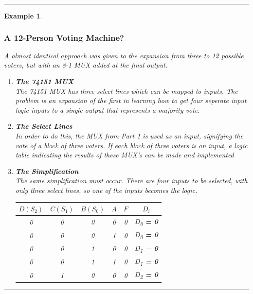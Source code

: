 \documentclass[12pt]{article}
\newtheorem{example}{Example}
\newenvironment{examp}
{
	\vspace{.5cm}
	\hrule
\begin{example}\upshape}
	{\hrule
		\vspace{0.5cm}
\end{example}}
\begin{document}
\begin{examp}
	\subsubsection*{A 12-Person Voting Machine?}
	A almost identical approach was given to the expansion from three to 12 possible
	voters, but with an 8-1 MUX added at the final output.
	\begin{enumerate}
		\item \textbf{The 74151 MUX}\\
		      The 74151 MUX has \textit{three} select lines which can be mapped to
		      inputs. The problem is an expansion of the first in learning how to
		      get four seperate input logic inputs to a single output that represents a
		      majority vote.
		\item \textbf{The Select Lines}\\
		      In order to do this, the MUX from Part 1 is used as an input, signifying
		      the vote of a block of three voters.
		      If each block of three voters is an input, a logic table indicating the
		      results of these MUX's can be made and implemented
		\item \textbf{The Simplification}\\
		      The same simplification must occur. There are four inputs to be selected,
		      with only three select lines, so one of the inputs becomes the logic.
		      \begin{table}[H]
			      \centering
			      \begin{tabular}{|c|c|c|c|c|c|}
				      \hline
				      \(D (S_2)\)             & \(C (S_1)\) & \(B (S_0)\) & \(A\) & \(F\) & \(D_i\)                         \\
				      \hline
				      \rowcolor[gray]{.9} 0   & 0           & 0           & 0     & 0     & D\textsubscript{0} \textbf{= 0} \\
				      \rowcolor[gray]{.9}		0  & 0           & 0           & 1     & 0     & D\textsubscript{0} \textbf{= 0} \\
				      0                       & 0           & 1           & 0     & 0     & D\textsubscript{1} \textbf{= 0} \\
				      \rowcolor[gray]{.9} 0   & 0           & 1           & 1     & 0     & D\textsubscript{1} \textbf{= 0} \\
				      \rowcolor[gray]{.9} 		0 & 1           & 0           & 0     & 0     & D\textsubscript{2} \textbf{= 0} \\

\end{tabular}
\end{table}
\end{enumerate}
\end{examp}
\end{document}
